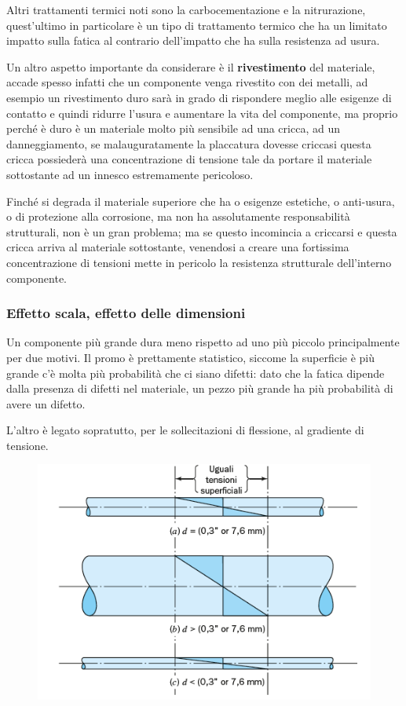 			Altri trattamenti termici noti sono la carbocementazione e la nitrurazione, quest'ultimo in particolare è un tipo di trattamento termico che ha un limitato impatto sulla fatica al contrario dell'impatto che ha sulla resistenza ad usura. \newline 
			
			Un altro aspetto importante da considerare è il \textbf{rivestimento} del materiale, accade spesso infatti che un componente venga rivestito con dei metalli, ad esempio un rivestimento duro sarà in grado di rispondere meglio alle esigenze di contatto e quindi ridurre l'usura e aumentare la vita del componente, ma proprio perché è duro è un materiale molto più sensibile ad una cricca, ad un danneggiamento, se malauguratamente la placcatura dovesse criccasi questa cricca possiederà una concentrazione di tensione tale da portare il materiale sottostante ad un innesco estremamente pericoloso.
			
			 Finché si degrada il materiale superiore che ha o esigenze estetiche, o anti-usura, o di protezione alla corrosione, ma non ha assolutamente responsabilità strutturali, non è un gran problema; ma se questo incomincia a criccarsi e questa cricca arriva al materiale sottostante, venendosi a creare una fortissima concentrazione di tensioni mette in pericolo la resistenza strutturale dell'interno componente. 
			 
\subsubsection{Effetto scala, effetto delle dimensioni }
			 Un componente più grande dura meno rispetto ad uno più piccolo principalmente per due motivi. Il promo è prettamente statistico, siccome la superficie è più grande c'è molta più probabilità che ci siano difetti: dato che la fatica dipende dalla presenza di difetti nel materiale, un pezzo più grande ha più probabilità di avere un difetto.
			 
			 L'altro è legato sopratutto, per le sollecitazioni di flessione, al gradiente di tensione.
			 
			 \begin{figure}[H]
			 	\centering
			 	\includegraphics[width=0.5\linewidth]{immagini_10/screenshot024}
			 	\label{fig:screenshot024}
			 \end{figure}
			 
